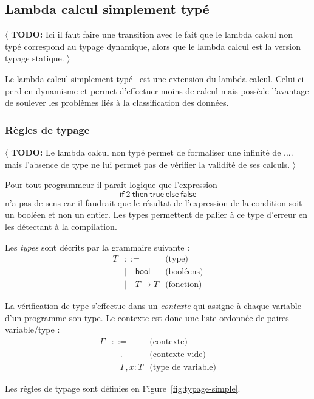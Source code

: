 \documentclass{article}
\newcommand{\TODO}[1]{$\langle$ \textbf{TODO:} #1 $\rangle$}
\theoremstyle{definition}
\theoremstyle{remark}
\begin{document}
\subsection{Lambda calcul simplement typé}

\TODO{Ici il faut faire une transition avec le fait que le lambda
  calcul non typé correspond au typage dynamique, alors que le lambda
  calcul est la version typage statique.}


Le lambda calcul simplement typé~\citep{church:simple-type} est une
extension du lambda calcul. Celui ci perd en dynamisme et permet
d'effectuer moins de calcul mais possède l'avantage de soulever les
problèmes liés à la classification des données.


\subsubsection{Règles de typage}

\TODO{Le lambda calcul non typé permet de formaliser une infinité de ....
 mais l'absence de type ne lui permet pas de vérifier la validité de ses
 calculs.}

Pour tout programmeur il parait logique que l'expression
%
\[
 \mathsf{if}\: 2\: \mathsf{then}\: \mathsf{true}\: \mathsf{else}\: \mathsf{false}
\]
%
n'a pas de sens car il faudrait que le résultat de l'expression de la
condition soit un booléen et non un entier. Les types permettent de
palier à ce type d'erreur en les détectant à la compilation.


Les \emph{types} sont décrits par la grammaire suivante :
%
\begin{align*}
  T &::=             & \mbox{(type)} \\
    &|\quad \mathsf{bool} & \mbox{(booléens)} \\
    &|\quad T \rightarrow T   &  \mbox{(fonction)} 
\end{align*}

La vérification de type s'effectue dans un \emph{contexte} qui assigne
à chaque variable d'un programme son type. Le contexte est donc une
liste ordonnée de paires variable/type :
%
\begin{align*}
  \Gamma &::= &\mbox{(contexte)} \\
         &\quad . & \mbox{(contexte vide)} \\
         &\quad \Gamma, x : T & \mbox{(type de variable)} 
\end{align*}

Les règles de typage sont définies en Figure~\ref{fig:typage-simple}.
\end{document}
